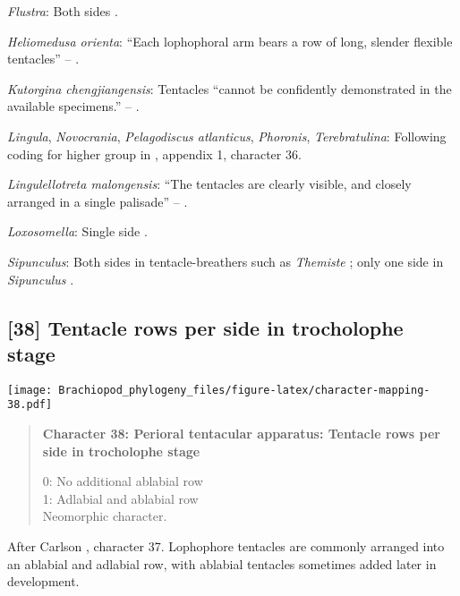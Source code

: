\documentclass[openany]{book}
\theoremstyle{definition}
\theoremstyle{definition}
\theoremstyle{definition}
\theoremstyle{remark}
\begin{document}
\hypertarget{Flustra-coding-37}{}
\emph{Flustra}: Both sides \citep{Schwaha2015, Shunkina2015}.

\hypertarget{Heliomedusa_orienta-coding-37}{}
\emph{Heliomedusa orienta}: ``Each lophophoral arm bears a row of long,
slender flexible tentacles'' -- \citet{Zhang2009Architectureand}.

\hypertarget{Kutorgina_chengjiangensis-coding-37}{}
\emph{Kutorgina chengjiangensis}: Tentacles ``cannot be confidently
demonstrated in the available specimens.'' --
\citet{Zhang2007Rhynchonelliformeanbrachiopods}.

\hypertarget{Lingula-coding-37}{}
\emph{Lingula}, \emph{Novocrania}, \emph{Pelagodiscus atlanticus},
\emph{Phoronis}, \emph{Terebratulina}: Following coding for higher group
in \citet{Carlson1995Phylogeneticrelationships}, appendix 1, character
36.

\hypertarget{Lingulellotreta_malongensis-coding-37}{}
\emph{Lingulellotreta malongensis}: ``The tentacles are clearly visible,
and closely arranged in a single palisade'' -- \citet{Zhang2004Newdata}.

\hypertarget{Loxosomella-coding-37}{}
\emph{Loxosomella}: Single side \citep{Nielsen1966}.

\hypertarget{Sipunculus-coding-37}{}
\emph{Sipunculus}: Both sides in tentacle-breathers such as
\emph{Themiste} \citep{Ruppert1995, Adrianov2006}; only one side in
\emph{Sipunculus} \citep{Ruppert1995, Adrianov2006}.

\subsection*{{[}38{]} Tentacle rows per side in trocholophe
stage}\label{tentacle-rows-per-side-in-trocholophe-stage}

\texttt{[image: Brachiopod\_phylogeny\_files/figure-latex/character-mapping-38.pdf]}

\begin{quote}
\textbf{Character 38: Perioral tentacular apparatus: Tentacle rows per
side in trocholophe stage}

0: No additional ablabial row\\
1: Adlabial and ablabial row\\
Neomorphic character.
\end{quote}

After Carlson \citeyearpar{Carlson1995Phylogeneticrelationships},
character 37. Lophophore tentacles are commonly arranged into an
ablabial and adlabial row, with ablabial tentacles sometimes added later
in development.
\end{document}
